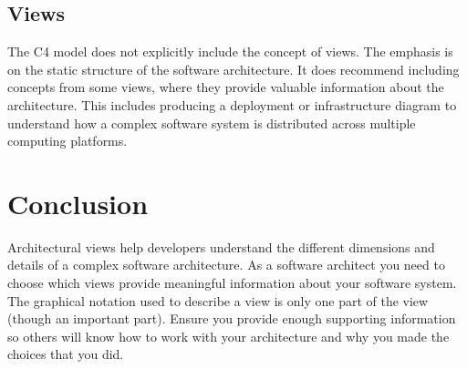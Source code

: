 \subsection{Views}
The C4 model does not explicitly include the concept of views.
The emphasis is on the static structure of the software architecture.
It does recommend including concepts from some views, where they provide valuable information about the architecture.
This includes producing a deployment or infrastructure diagram to understand how a complex software system is distributed across multiple computing platforms.

\section{Conclusion}
Architectural views help developers understand the different dimensions and details of a complex software architecture.
As a software architect you need to choose which views provide meaningful information about your software system.
The graphical notation used to describe a view is only one part of the view (though an important part).
Ensure you provide enough supporting information so others will know how to work with your architecture and why you made the choices that you did.